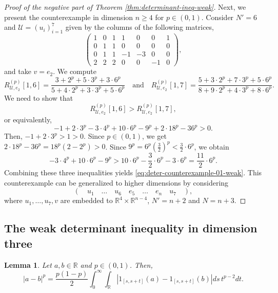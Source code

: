\documentclass[11pt,a4paper]{amsart}
\theoremstyle{plain}
\newtheorem{lemma}[theorem]{Lemma}
\theoremstyle{definition}
\newcommand{\R}{\mathbb R}
\begin{document}
\begin{proof}[Proof of the negative part of Theorem \ref{thm:determinant-ineq-weak}]
Next, we present the counterexample in dimension $n \geq 4$ for $p \in (0,1)$. Consider $N'=6$ and $\mathcal{U}=(u_i)_{i=1}^7$ given by the columns of the following matrices,
\begin{equation}
    \begin{pmatrix}
        1&0&1&1&0&0&1\\
        0&1&1&0&0&0&0\\
        0&1&1&-1&-3&0&0\\
        2&2&2&0&0&-1&0
    \end{pmatrix},
\end{equation}
and take $ v = e_2$. We compute 
\[
    R_{\mathcal{U},e_2}^{(p)}[1,6] = \frac{3+2^p+5 \cdot 3^p+3 \cdot 6^p}{5+4 \cdot 2^p+3 \cdot 3^p+5 \cdot 6^p} \quad \text{and} \quad R_{\mathcal{U},e_2}^{(p)}[1,7] = \frac{5+3 \cdot 2^p+7 \cdot 3^p+5 \cdot 6^p}{8+9 \cdot 2^p+4 \cdot 3^p+8 \cdot 6^p}.
\]
We need to show that
\[
    R_{\mathcal{U},e_2}^{(p)}[1,6]
>
R_{\mathcal{U},e_2}^{(p)}[1,7],
\]
or equivalently,
\begin{equation} \label{eq:deter-counterexample-01-weak}
    -1 +2\cdot 3^p -3 \cdot 4^p+ 10 \cdot 6^p - 9^p + 2 \cdot 18^p - 36^p >0.
\end{equation}
Then, $-1 +2\cdot 3^p >1 >0$.
Since $p \in (0,1)$, we get $2 \cdot 18^p - 36^p = 18^p (2 - 2^p) >0$. Since $9^p = 6^p \left(\frac{3}{2}\right)^p <\frac{3}{2} \cdot 6^p$, we obtain
\[
    -3 \cdot 4^p+ 10 \cdot 6^p - 9^p > 10 \cdot 6^p -\frac{3}{2} \cdot 6^p - 3 \cdot 6^p = \frac{11}{2} \cdot 6^p.
\]
Combining these three inequalities yields \eqref{eq:deter-counterexample-01-weak}. This counterexample can be generalized to higher dimensions by considering 
$$
    (\quad u_1 \quad \ldots \quad u_6 \quad e_5 \quad \ldots \quad e_n \quad u_7 \quad ),
$$
where $u_1,\ldots,u_7,v$ are embedded to $\R^4 \times \R^{n-4}$, $N' = n+2$ and $N = n+3$.
\end{proof}
\subsection{The weak determinant inequality in dimension three}


\begin{lemma} \label{lem:representation-p-01}
    Let $ a,b \in \R$ and $ p \in (0,1)$. Then,
    \[
        |a-b|^p=\frac{p(1-p)}{2} \int_0^{\infty} \int_{\mathbb{R}}\left|{1}_{[s, s+t]}(a)-{1}_{[s, s+t]}(b)\right| d s \, t^{p-2} d t.
    \]
\end{lemma}
\end{document}
